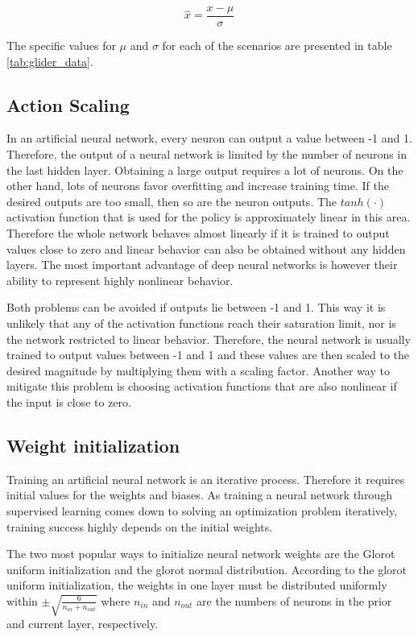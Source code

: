 \begin{equation}
\hat{x} = \frac{x - \mu}{\sigma}
\end{equation}

The specific values for $\mu$ and $\sigma$ for each of the scenarios are presented in table \ref{tab:glider_data}.

\subsection*{Action Scaling}

In an artificial neural network, every neuron can output a value between -1 and 1. Therefore, the output of a neural network is limited by the number of neurons in the last hidden layer. Obtaining a large output requires a lot of neurons. On the other hand, lots of neurons favor overfitting and increase training time. If the desired outputs are too small, then so are the neuron outputs. The $tanh(\cdot)$ activation function that is used for the policy is approximately linear in this area. Therefore the whole network behaves almost linearly if it is trained to output values close to zero and linear behavior can also be obtained without any hidden layers. The most important advantage of deep neural networks is however their ability to represent highly nonlinear behavior.

Both problems can be avoided if outputs lie between -1 and 1. This way it is unlikely that any of the activation functions reach their saturation limit, nor is the network restricted to linear behavior. Therefore, the neural network is usually trained to output values between -1 and 1 and these values are then scaled to the desired magnitude by multiplying them with a scaling factor. Another way to mitigate this problem is choosing activation functions that are also nonlinear if the input is close to zero.

\subsection*{Weight initialization}

Training an artificial neural network is an iterative process. Therefore it requires initial values for the weights and biases. As training a neural network through supervised learning comes down to solving an optimization problem iteratively, training success highly depends on the initial weights.

The two most popular ways to initialize neural network weights are the Glorot uniform initialization and the glorot normal distribution. According to the glorot uniform initialization, the weights in one layer must be distributed uniformly within $\pm \sqrt{\frac{6}{n_{in}+n_{out}}}$ where $n_{in}$ and $n_{out}$ are the numbers of neurons in the prior and current layer, respectively.

